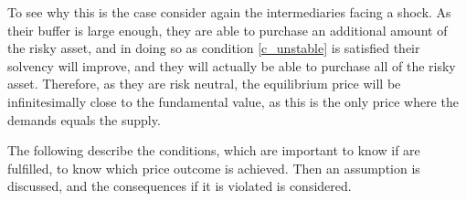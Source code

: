 \documentclass[11pt]{article}
\newtheorem{corollary}{Corollary}
\begin{document}
\begin{appendices}
\iffalse
\begin{corollary}[Sharpe ratios]
Sharpe ratios will be $SR = ( \mu - p_1 ) / \sigma \in [0,z\gamma\sigma]$. When $z$ is normalised to one this becomes $SR \in [0,\gamma\sigma]$, where $\gamma\sigma$ is the price impact. Therefore the SR in crises are determined by the risky assets price impact (in bad times if time varying). The CHANGE in SR, ie the additional effect of the crises will be $\Delta SR = x^I_0\gamma\sigma$ ie this price impact times the proportion of the asset held by the intermediaries in period 0. So we can see already now that if the market is efficient (or growth is optimal/high) and the financial intermediaries are well capitalised, the SR is low in period 0 and $x^I_0$ is close to 1 and the SR is close to 0, the fire sale /crises effect will be bigger.

[low SR in p0 may indicate that SR can rise by more in p1]

\end{corollary}
\fi

To see why this is the case consider again the intermediaries facing a shock. As their buffer is large enough, they are able to purchase an additional amount of the risky asset, and in doing so as condition \ref{c_unstable} is satisfied their solvency will improve, and they will actually be able to purchase all of the risky asset. Therefore, as they are risk neutral, the equilibrium price will be infinitesimally close to the fundamental value, as this is the only price where the demands equals the supply.

The following describe the conditions, which are important to know if are fulfilled, to know which price outcome is achieved. Then an assumption is discussed, and the consequences if it is violated is considered.


\end{appendices}
\end{document}
